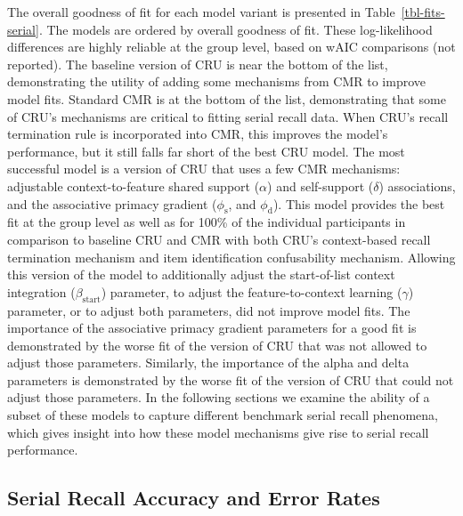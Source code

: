 \documentclass[
  man,
  floatsintext,
  longtable,
  nolmodern,
  notxfonts,
  notimes,
  draftfirst,
  colorlinks=true,linkcolor=blue,citecolor=blue,urlcolor=blue]{apa7}
\begin{document}
The overall goodness of fit for each model variant is presented in
Table~\ref{tbl-fits-serial}. The models are ordered by overall goodness
of fit. These log-likelihood differences are highly reliable at the
group level, based on wAIC comparisons (not reported). The baseline
version of CRU is near the bottom of the list, demonstrating the utility
of adding some mechanisms from CMR to improve model fits. Standard CMR
is at the bottom of the list, demonstrating that some of CRU's
mechanisms are critical to fitting serial recall data. When CRU's recall
termination rule is incorporated into CMR, this improves the model's
performance, but it still falls far short of the best CRU model. The
most successful model is a version of CRU that uses a few CMR
mechanisms: adjustable context-to-feature shared support (\(\alpha\))
and self-support (\(\delta\)) associations, and the associative primacy
gradient (\(\phi_\text{s}\), and \(\phi_\text{d}\)). This model provides
the best fit at the group level as well as for 100\% of the individual
participants in comparison to baseline CRU and CMR with both CRU's
context-based recall termination mechanism and item identification
confusability mechanism. Allowing this version of the model to
additionally adjust the start-of-list context integration
(\(\beta_\text{start}\)) parameter, to adjust the feature-to-context
learning (\(\gamma\)) parameter, or to adjust both parameters, did not
improve model fits. The importance of the associative primacy gradient
parameters for a good fit is demonstrated by the worse fit of the
version of CRU that was not allowed to adjust those parameters.
Similarly, the importance of the alpha and delta parameters is
demonstrated by the worse fit of the version of CRU that could not
adjust those parameters. In the following sections we examine the
ability of a subset of these models to capture different benchmark
serial recall phenomena, which gives insight into how these model
mechanisms give rise to serial recall performance.

\subsection{Serial Recall Accuracy and Error
Rates}\label{serial-recall-accuracy-and-error-rates}
\end{document}

